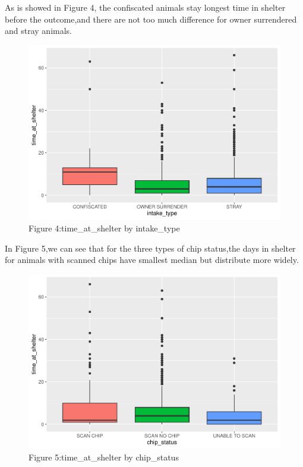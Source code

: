 \documentclass[
]{article}
\begin{document}
As is showed in Figure 4, the confiscated animals stay longest time in
shelter before the outcome,and there are not too much difference for
owner surrendered and stray animals.

\begin{figure}[H]

{\centering \includegraphics[width=0.68\linewidth]{Group_16_Project_files/figure-latex/unnamed-chunk-5-1} 

}

\caption{\label{fig:box} Figure 4:time\_at\_shelter by intake\_type}\label{fig:unnamed-chunk-5}
\end{figure}

In Figure 5,we can see that for the three types of chip status,the days
in shelter for animals with scanned chips have smallest median but
distribute more widely.

\begin{figure}[H]

{\centering \includegraphics[width=0.68\linewidth]{Group_16_Project_files/figure-latex/unnamed-chunk-6-1} 

}

\caption{\label{fig:box} Figure 5:time\_at\_shelter by chip\_status}\label{fig:unnamed-chunk-6}
\end{figure}
\end{document}
